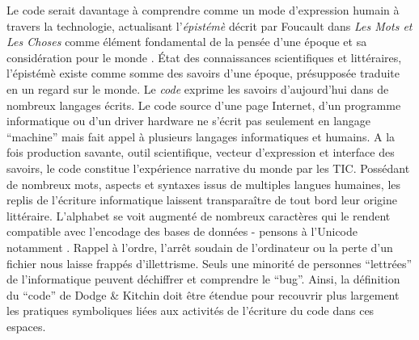 Le code serait davantage à comprendre comme un mode d’expression humain à travers la technologie, actualisant l’\textit{épistémè} décrit par Foucault dans \textit{Les Mots et Les Choses} comme élément fondamental de la pensée d’une époque et sa considération pour le monde \citep{Foucault1996}. \'Etat des connaissances scientifiques et littéraires, l'épistémè existe comme somme des savoirs d’une époque, présupposée traduite en un regard sur le monde. Le \textit{code} exprime les savoirs d’aujourd’hui dans de nombreux langages écrits. Le code source d’une page Internet, d’un programme informatique ou d’un driver hardware ne s’écrit pas seulement en langage ``machine'' mais fait appel à plusieurs langages informatiques et humains. A la fois production savante, outil scientifique, vecteur d’expression et interface des savoirs, le code constitue l’expérience narrative du monde par les TIC. Possédant de nombreux mots, aspects et syntaxes issus de multiples langues humaines, les replis de l’écriture informatique laissent transparaître de tout bord leur origine littéraire. L'alphabet se voit augmenté de nombreux caractères qui le rendent compatible avec l’encodage des bases de données - pensons à l’Unicode notamment \citep{Guichard2014}. Rappel à l'ordre, l'arrêt soudain de l’ordinateur ou la perte d’un fichier nous laisse frappés d’illettrisme. Seuls une minorité de personnes ``lettrées'' de l’informatique peuvent déchiffrer et comprendre le ``bug''. Ainsi, la définition du ``code'' de Dodge \&  Kitchin doit être étendue pour recouvrir plus largement les pratiques symboliques liées aux activités de l’écriture du code dans ces espaces.


